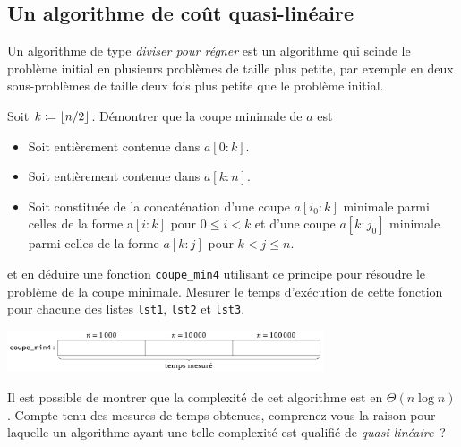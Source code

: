 \documentclass{magnolia}
\begin{document}
\subsection{Un algorithme de coût quasi-linéaire}

Un algorithme de type \emph{diviser pour régner} est un algorithme qui scinde le problème initial en plusieurs
problèmes de taille plus petite, par exemple en deux sous-problèmes de taille deux fois plus petite que le
problème initial.

\begin{questions}
\question Soit $k\coloneqq\left\lfloor n/2\right\rfloor$. Démontrer que la coupe minimale de $a$ est
  \begin{itemize}
  \item Soit entièrement contenue dans $a[0:k]$.
  \item Soit entièrement contenue dans $a[k:n]$.
  \item Soit constituée de la concaténation d'une coupe $a[i_0:k]$ minimale parmi celles de la forme a$[i:k]$
    pour $0\leq i<k$ et d'une coupe $a[k:j_0]$ minimale parmi celles de la forme $a[k:j]$ pour $k<j\leq n$.
  \end{itemize}
  et en déduire une fonction \verb!coupe_min4! utilisant ce principe pour résoudre le problème de la coupe
  minimale.
\question Mesurer le temps d'exécution de cette fonction pour chacune des listes \verb!lst1!, \verb!lst2! et \verb!lst3!.
\begin{center}
  \includegraphics[width=0.7\textwidth]{../../Commun/Images/python-tp-coupe-4}
  \end{center}
\question Il est possible de montrer que la complexité de cet algorithme est en $\Theta(n \log n)$. Compte tenu des
  mesures de temps obtenues, comprenez-vous la raison pour laquelle un algorithme ayant une telle complexité est
  qualifié de \emph{quasi-linéaire}~?
\end{questions}
\end{document}
